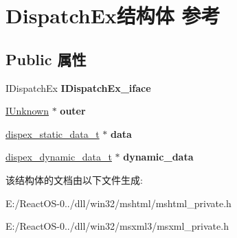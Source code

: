 \hypertarget{struct_dispatch_ex}{}\section{Dispatch\+Ex结构体 参考}
\label{struct_dispatch_ex}
\subsection*{Public 属性}
\begin{DoxyCompactItemize}
\item 
\mbox{\label{struct_dispatch_ex_ab34397dc4321cf1e7460e7a308f5faad}} 
I\+Dispatch\+Ex {\bfseries I\+Dispatch\+Ex\+\_\+iface}
\item 
\mbox{\label{struct_dispatch_ex_accf6982a7401b37b6f4fa4bd927d3330}} 
\hyperlink{interface_i_unknown}{I\+Unknown} $\ast$ {\bfseries outer}
\item 
\mbox{\label{struct_dispatch_ex_a44e9be3bb6add8de6b24c9feb178a812}} 
\hyperlink{structdispex__static__data__t}{dispex\+\_\+static\+\_\+data\+\_\+t} $\ast$ {\bfseries data}
\item 
\mbox{\label{struct_dispatch_ex_acb92560f0c8388eb886708e66e5531ec}} 
\hyperlink{structdispex__dynamic__data__t}{dispex\+\_\+dynamic\+\_\+data\+\_\+t} $\ast$ {\bfseries dynamic\+\_\+data}
\end{DoxyCompactItemize}


该结构体的文档由以下文件生成\+:\begin{DoxyCompactItemize}
\item 
E\+:/\+React\+O\+S-\/0../dll/win32/mshtml/mshtml\+\_\+private.\+h\item 
E\+:/\+React\+O\+S-\/0../dll/win32/msxml3/msxml\+\_\+private.\+h\end{DoxyCompactItemize}
